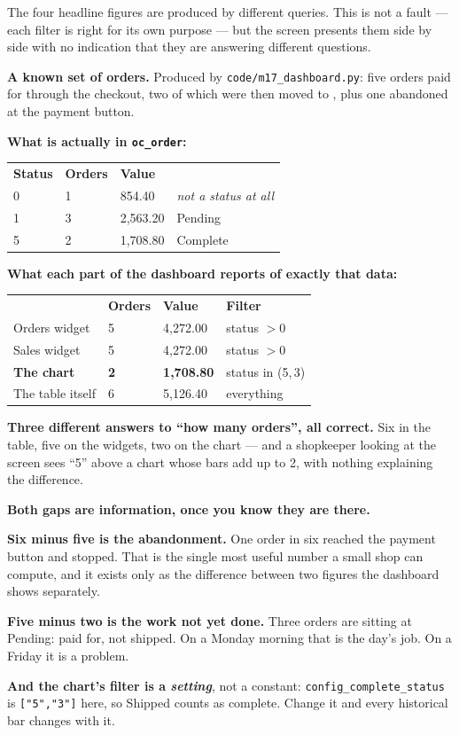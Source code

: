 The four headline figures are produced by different queries. This is not a
fault --- each filter is right for its own purpose --- but the screen presents
them side by side with no indication that they are answering different
questions.

\begin{worked}
\textbf{A known set of orders.} Produced by \texttt{code/m17\_dashboard.py}:
five orders paid for through the checkout, two of which were then moved to
, plus one abandoned at the payment button.

\smallskip
\textbf{What is actually in \texttt{oc\_order}:}

\smallskip
\begin{tabular}{@{}L{3.0cm}L{2.6cm}L{3.4cm}L{4.4cm}@{}}
\textbf{Status} & \textbf{Orders} & \textbf{Value} & \\
0 & 1 & 854.40 & \emph{not a status at all} \\
1 & 3 & 2{,}563.20 & Pending \\
5 & 2 & 1{,}708.80 & Complete \\
\end{tabular}

\smallskip
\textbf{What each part of the dashboard reports of exactly that data:}

\smallskip
\begin{tabular}{@{}L{5.1cm}L{2.4cm}L{3.0cm}L{2.8cm}@{}}
& \textbf{Orders} & \textbf{Value} & \textbf{Filter} \\
Orders widget & 5 & 4{,}272.00 & status $>0$ \\
Sales widget & 5 & 4{,}272.00 & status $>0$ \\
\textbf{The chart} & \textbf{2} & \textbf{1{,}708.80} & status in (5,\,3) \\
The table itself & 6 & 5{,}126.40 & everything \\
\end{tabular}

\smallskip
\textbf{Three different answers to ``how many orders'', all correct.} Six in
the table, five on the widgets, two on the chart --- and a shopkeeper looking
at the screen sees ``5'' above a chart whose bars add up to 2, with nothing
explaining the difference.

\smallskip
\textbf{Both gaps are information, once you know they are there.}

\smallskip
\textbf{Six minus five is the abandonment.} One order in six reached the
payment button and stopped. That is the single most useful number a small shop
can compute, and it exists only as the difference between two figures the
dashboard shows separately.

\smallskip
\textbf{Five minus two is the work not yet done.} Three orders are sitting at
Pending: paid for, not shipped. On a Monday morning that is the day's job. On a
Friday it is a problem.

\smallskip
\textbf{And the chart's filter is a \emph{setting}}, not a constant:
\texttt{config\_complete\_status} is \texttt{["5","3"]} here, so Shipped counts
as complete. Change it and every historical bar changes with it.
\end{worked}

